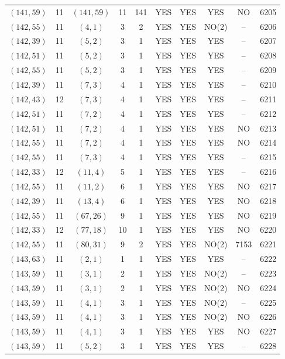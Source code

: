 \begin{longtable}{|c|c|c|c|c|c|c|c|c|c|}
$(141, 59)$ & 11 & $(141, 59)$ & 11 & 141 & YES & YES & YES & NO & 6205\\
$(142, 55)$ & 11 & $(4, 1)$ & 3 & 2 & YES & YES & NO(2) & -- & 6206\\
$(142, 39)$ & 11 & $(5, 2)$ & 3 & 1 & YES & YES & YES & -- & 6207\\
$(142, 51)$ & 11 & $(5, 2)$ & 3 & 1 & YES & YES & YES & -- & 6208\\
$(142, 55)$ & 11 & $(5, 2)$ & 3 & 1 & YES & YES & YES & -- & 6209\\
$(142, 39)$ & 11 & $(7, 3)$ & 4 & 1 & YES & YES & YES & -- & 6210\\
$(142, 43)$ & 12 & $(7, 3)$ & 4 & 1 & YES & YES & YES & -- & 6211\\
$(142, 51)$ & 11 & $(7, 2)$ & 4 & 1 & YES & YES & YES & -- & 6212\\
$(142, 51)$ & 11 & $(7, 2)$ & 4 & 1 & YES & YES & YES & NO & 6213\\
$(142, 55)$ & 11 & $(7, 2)$ & 4 & 1 & YES & YES & YES & NO & 6214\\
$(142, 55)$ & 11 & $(7, 3)$ & 4 & 1 & YES & YES & YES & -- & 6215\\
$(142, 33)$ & 12 & $(11, 4)$ & 5 & 1 & YES & YES & YES & -- & 6216\\
$(142, 55)$ & 11 & $(11, 2)$ & 6 & 1 & YES & YES & YES & NO & 6217\\
$(142, 39)$ & 11 & $(13, 4)$ & 6 & 1 & YES & YES & YES & NO & 6218\\
$(142, 55)$ & 11 & $(67, 26)$ & 9 & 1 & YES & YES & YES & NO & 6219\\
$(142, 33)$ & 12 & $(77, 18)$ & 10 & 1 & YES & YES & YES & NO & 6220\\
$(142, 55)$ & 11 & $(80, 31)$ & 9 & 2 & YES & YES & NO(2) & 7153 & 6221\\
$(143, 63)$ & 11 & $(2, 1)$ & 1 & 1 & YES & YES & YES & -- & 6222\\
$(143, 59)$ & 11 & $(3, 1)$ & 2 & 1 & YES & YES & NO(2) & -- & 6223\\
$(143, 59)$ & 11 & $(3, 1)$ & 2 & 1 & YES & YES & NO(2) & NO & 6224\\
$(143, 59)$ & 11 & $(4, 1)$ & 3 & 1 & YES & YES & NO(2) & -- & 6225\\
$(143, 59)$ & 11 & $(4, 1)$ & 3 & 1 & YES & YES & NO(2) & NO & 6226\\
$(143, 59)$ & 11 & $(4, 1)$ & 3 & 1 & YES & YES & YES & NO & 6227\\
$(143, 59)$ & 11 & $(5, 2)$ & 3 & 1 & YES & YES & YES & -- & 6228\\

\end{longtable}
